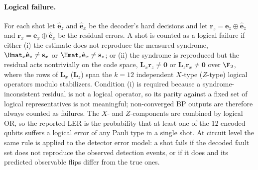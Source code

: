\paragraph{Logical failure.}
For each shot let $\hat{\mathbf{e}}_z$ and $\hat{\mathbf{e}}_x$ be the
decoder's hard decisions and let
$\mathbf{r}_z=\mathbf{e}_z\oplus\hat{\mathbf{e}}_z$ and
$\mathbf{r}_x=\mathbf{e}_x\oplus\hat{\mathbf{e}}_x$ be the residual
errors. A shot is counted as a logical failure if either
(i) the estimate does not reproduce the measured syndrome,
$\Hmat_x\hat{\mathbf{e}}_z\neq\mathbf{s}_x$ or
$\Hmat_z\hat{\mathbf{e}}_x\neq\mathbf{s}_z$; or
(ii) the syndrome is reproduced but the residual acts nontrivially on the
code space, $\mathbf{L}_x\mathbf{r}_z\neq\mathbf{0}$ or
$\mathbf{L}_z\mathbf{r}_x\neq\mathbf{0}$ over $\F_2$, where the rows of
$\mathbf{L}_x$ ($\mathbf{L}_z$) span the $k=12$ independent $X$-type
($Z$-type) logical operators modulo stabilizers. Condition (i) is required
because a syndrome-inconsistent residual is not a logical operator, so its
parity against a fixed set of logical representatives is not meaningful;
non-converged BP outputs are therefore always counted as failures. The
$X$- and $Z$-components are combined by logical OR, so the reported LER is
the probability that at least one of the 12 encoded qubits suffers a
logical error of any Pauli type in a single shot. At circuit level the same
rule is applied to the detector error model: a shot fails if the decoded
fault set does not reproduce the observed detection events, or if it does
and its predicted observable flips differ from the true ones.
